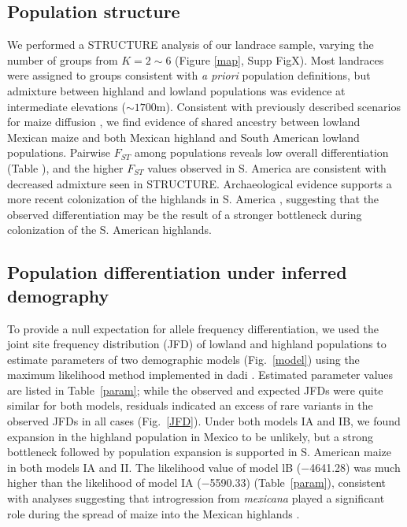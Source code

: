 \subsection*{Population structure}

We performed a {\sf STRUCTURE} analysis \cite[]{Pritchard_2000_10835412,Falush_2003_12930761} of our landrace sample, varying the number of groups from $K=2\sim 6$ (Figure \ref{map}, Supp FigX). 
Most landraces were assigned to groups consistent with \emph{a priori} population definitions, but admixture between highland and lowland populations was evidence at intermediate elevations ($\sim1700$m).  Consistent with previously described scenarios for maize diffusion \cite[]{Piperno_2006_69}, we find evidence of shared ancestry between lowland Mexican maize and both Mexican highland and South American lowland populations.  Pairwise $F_{ST}$ among populations reveals low overall differentiation (Table \label{FstP}), and the higher $F_{ST}$ values observed in S. America are consistent with decreased admixture seen in STRUCTURE.  Archaeological evidence supports a more recent colonization of the highlands in S. America  \cite[]{Piperno_2006_69,Perry_2006_16511492,Grobman_2012_22307642}, suggesting that the observed differentiation may be the result of a stronger  bottleneck during colonization of the S. American highlands. 

\subsection*{Population differentiation under inferred demography}

To provide a null expectation for allele frequency differentiation, we used the joint site frequency distribution (JFD) of lowland and highland populations to estimate parameters of two demographic models (Fig.~\ref{model}) using the maximum likelihood method implemented in {\sf dadi} \cite[]{Gutenkunst_2009_19851460}.  
Estimated parameter values are listed in Table~\ref{param}; while the observed and expected JFDs were quite similar for both models,  residuals indicated an excess of rare variants in the observed JFDs in all cases (Fig.~\ref{JFD}). 
Under both models IA and IB,  we found expansion in the highland population in Mexico to be unlikely, but a strong bottleneck followed by population expansion is supported in S. American maize in both models IA and II.  
The likelihood value of model lB ($-$4641.28) was much higher than the likelihood of model IA ($-$5590.33) (Table~\ref{param}), consistent with analyses suggesting that introgression from \emph{mexicana} played a significant role during the spread of maize into the Mexican highlands \cite{Profford_2013}. 

